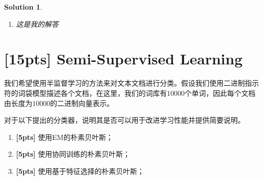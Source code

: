 \documentclass[a4paper,UTF8]{article}
\numberwithin{equation}{section}
\newtheorem*{solution}{Solution}
\begin{document}
\begin{solution}
\begin{enumerate}
\begin{eqnarray}
		\end{eqnarray}
		定义指示函数：
		$$\mathbb{I}(y=j)=
		\begin{cases}
		1& \text{若$y$等于$j$}\\
		0& \text{若$y$不等于$j$}
		\end{cases}$$
		给定数据集为$\{(\mathbf{x_i}, y_i)\}_{i=1}^m$，则其对数似然为：
		\begin{eqnarray}
			l &=& \sum_{i=1}^m\sum_{k=1}^K\mathbb{I}(y_i=k)\ln{p(y_i|\mathbf{x_i})}
		\end{eqnarray}
	\item 这是我的解答
\end{enumerate}
\end{solution}
\newpage

\section{[15pts] Semi-Supervised Learning}
我们希望使用半监督学习的方法来对文本文档进行分类。假设我们使用二进制指示符的词袋模型描述各个文档，在这里，我们的词库有$10000$个单词，因此每个文档由长度为$10000$的二进制向量表示。

对于以下提出的分类器，说明其是否可以用于改进学习性能并提供简要说明。
\begin{enumerate}
	\item \textbf{[5pts]} 使用EM的朴素贝叶斯；
	\item \textbf{[5pts]} 使用协同训练的朴素贝叶斯；
	\item \textbf{[5pts]} 使用基于特征选择的朴素贝叶斯；
\end{enumerate}
\end{document}

